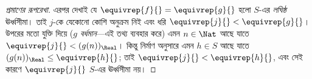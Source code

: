 \documentclass[../../../include/open-logic-section]{subfiles}
\begin{document}
\begin{proof}[প্রমাণের রূপরেখা]
এরপর দেখাই যে $\equivrep{f}{} = \equivrep{g}{}$ হলো $S$-এর \emph{লঘিষ্ঠ} ঊর্ধ্বসীমা। তাই $j$-কে যেকোনো কোশি অনুক্রম নিই এবং ধরি $\equivrep{j}{} < \equivrep{g}{}$। উপরের মতো যুক্তি দিয়ে ($g$ \emph{বর্ধমান}—এই তথ্য ব্যবহার করে) এমন $n \in \Nat$ আছে যাতে $\equivrep{j}{} < (g(n))_\Real$। কিন্তু নির্মাণ অনুসারে এমন $h \in S$ আছে যাতে $(g(n))_\Real \leq \equivrep{h}{}$; তাই $\equivrep{j}{} < \equivrep{h}{}$, এবং সেই কারণে $\equivrep{j}{}$ $S$-এর ঊর্ধ্বসীমা নয়।
\end{proof}
\end{document}

